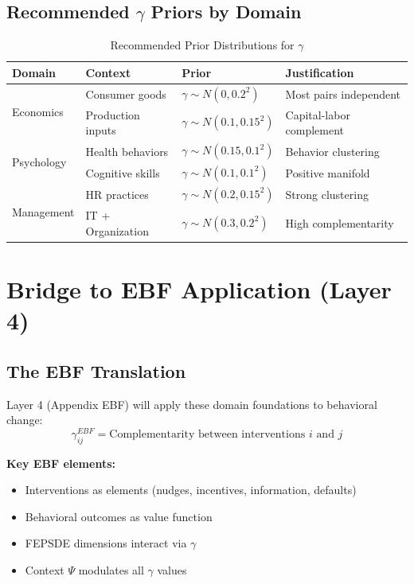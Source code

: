\subsection{Recommended $\gamma$ Priors by Domain}

\begin{table}[h]
\centering
\caption{Recommended Prior Distributions for $\gamma$}
\label{tab:priors}
\renewcommand{\arraystretch}{1.3}
\begin{tabular}{@{}llll@{}}
\toprule
\textbf{Domain} & \textbf{Context} & \textbf{Prior} & \textbf{Justification} \\
\midrule
\multirow{2}{*}{Economics} & Consumer goods & $\gamma \sim N(0, 0.2^2)$ & Most pairs independent \\
 & Production inputs & $\gamma \sim N(0.1, 0.15^2)$ & Capital-labor complement \\
\multirow{2}{*}{Psychology} & Health behaviors & $\gamma \sim N(0.15, 0.1^2)$ & Behavior clustering \\
 & Cognitive skills & $\gamma \sim N(0.1, 0.1^2)$ & Positive manifold \\
\multirow{2}{*}{Management} & HR practices & $\gamma \sim N(0.2, 0.15^2)$ & Strong clustering \\
 & IT + Organization & $\gamma \sim N(0.3, 0.2^2)$ & High complementarity \\
\bottomrule
\end{tabular}
\end{table}

\section{Bridge to EBF Application (Layer 4)}
\label{sec:bridge}

\subsection{The EBF Translation}

\begin{tcolorbox}[colback=red!5!white,colframe=red!75!black,title=\textbf{From Domain Foundations to EBF}]
Layer 4 (Appendix EBF) will apply these domain foundations to behavioral change:
\begin{equation}
\gamma^{EBF}_{ij} = \text{Complementarity between interventions } i \text{ and } j
\end{equation}

\textbf{Key EBF elements:}
\begin{itemize}[noitemsep]
    \item Interventions as elements (nudges, incentives, information, defaults)
    \item Behavioral outcomes as value function
    \item FEPSDE dimensions interact via $\gamma$
    \item Context $\Psi$ modulates all $\gamma$ values
\end{itemize}
\end{tcolorbox}

